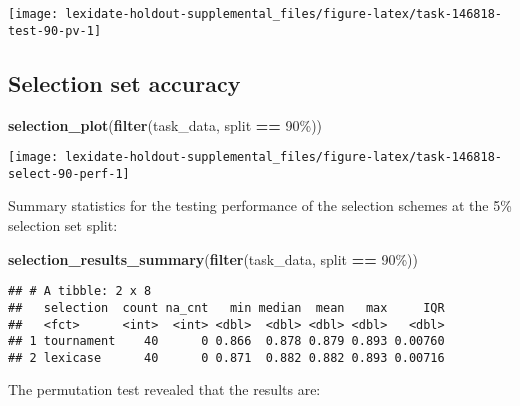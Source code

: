 \documentclass[
]{book}
\newenvironment{Shaded}{\begin{snugshade}}{\end{snugshade}}
\newcommand{\FunctionTok}[1]{\textcolor[rgb]{0.13,0.29,0.53}{\textbf{#1}}}
\newcommand{\NormalTok}[1]{#1}
\newcommand{\SpecialCharTok}[1]{\textcolor[rgb]{0.81,0.36,0.00}{\textbf{#1}}}
\newcommand{\StringTok}[1]{\textcolor[rgb]{0.31,0.60,0.02}{#1}}
\begin{document}
\texttt{[image: lexidate-holdout-supplemental\_files/figure-latex/task-146818-test-90-pv-1]}

\hypertarget{selection-set-accuracy-3}{%
\subsection{Selection set accuracy}\label{selection-set-accuracy-3}}

\begin{Shaded}
\begin{Highlighting}[]
\FunctionTok{selection\_plot}\NormalTok{(}\FunctionTok{filter}\NormalTok{(task\_data, split }\SpecialCharTok{==} \StringTok{\textquotesingle{}90\%\textquotesingle{}}\NormalTok{))}
\end{Highlighting}
\end{Shaded}

\texttt{[image: lexidate-holdout-supplemental\_files/figure-latex/task-146818-select-90-perf-1]}

Summary statistics for the testing performance of the selection schemes at the 5\% selection set split:

\begin{Shaded}
\begin{Highlighting}[]
\FunctionTok{selection\_results\_summary}\NormalTok{(}\FunctionTok{filter}\NormalTok{(task\_data, split }\SpecialCharTok{==} \StringTok{\textquotesingle{}90\%\textquotesingle{}}\NormalTok{))}
\end{Highlighting}
\end{Shaded}

\begin{verbatim}
## # A tibble: 2 x 8
##   selection  count na_cnt   min median  mean   max     IQR
##   <fct>      <int>  <int> <dbl>  <dbl> <dbl> <dbl>   <dbl>
## 1 tournament    40      0 0.866  0.878 0.879 0.893 0.00760
## 2 lexicase      40      0 0.871  0.882 0.882 0.893 0.00716
\end{verbatim}

The permutation test revealed that the results are:
\end{document}

